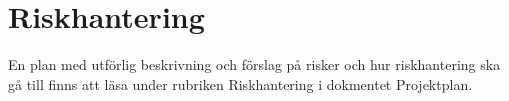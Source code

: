 \section{Riskhantering}
En plan med utförlig beskrivning och förslag på risker och hur riskhantering ska gå till finns att läsa under rubriken Riskhantering i dokmentet Projektplan.